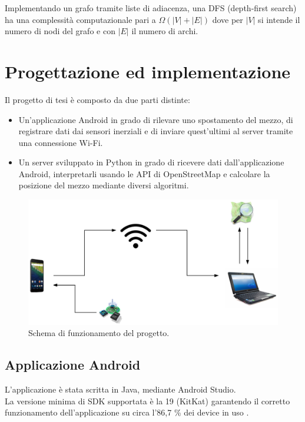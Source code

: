 \documentclass[12pt,a4paper,openright,twoside]{report}
\begin{document}
Implementando un grafo tramite liste di adiacenza, una DFS (depth-first search) ha una complessità computazionale pari a $\Omega(|V| + |E|) $ dove per $\left|V \right|$ si intende il numero di nodi del grafo e con $\left| E \right|$ il numero di archi.

\clearpage{\pagestyle{empty}\cleardoublepage}
\chapter{Progettazione ed implementazione}                %
\lhead[\fancyplain{}{\bfseries\thepage}]{\fancyplain{}{\bfseries\rightmark}}
Il progetto di tesi è composto da due parti distinte:

\begin{itemize}
\item Un'applicazione Android in grado di rilevare uno spostamento del mezzo, di registrare dati dai sensori inerziali e di inviare quest'ultimi al server tramite una connessione Wi-Fi.
\item Un server sviluppato in Python in grado di ricevere dati dall'applicazione Android, interpretarli usando le API di OpenStreetMap e calcolare la posizione del mezzo mediante diversi algoritmi.
\end{itemize}

\begin{figure}[h]
\centering 
\includegraphics[scale=0.4]{fig10} 
\caption{Schema di funzionamento del progetto.} 
\end{figure}
\newpage
\section{Applicazione Android}
L'applicazione è stata scritta in Java, mediante Android Studio. \\
La versione minima di SDK supportata è la 19 (KitKat) garantendo il corretto funzionamento dell'applicazione su circa l'86,7 \% dei device in uso \cite{K18}.
\end{document}
